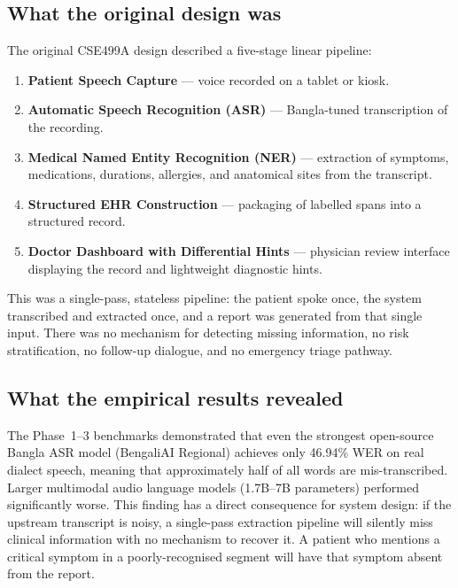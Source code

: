 \documentclass[12pt,a4paper]{article}
\begin{document}
\subsection{What the original design was}

The original CSE499A design described a five-stage linear pipeline:

\begin{enumerate}[leftmargin=*]
  \item \textbf{Patient Speech Capture} --- voice recorded on a tablet or kiosk.
  \item \textbf{Automatic Speech Recognition (ASR)} --- Bangla-tuned
        transcription of the recording.
  \item \textbf{Medical Named Entity Recognition (NER)} --- extraction of
        symptoms, medications, durations, allergies, and anatomical sites
        from the transcript.
  \item \textbf{Structured EHR Construction} --- packaging of labelled
        spans into a structured record.
  \item \textbf{Doctor Dashboard with Differential Hints} --- physician
        review interface displaying the record and lightweight diagnostic
        hints.
\end{enumerate}

This was a single-pass, stateless pipeline: the patient spoke once, the
system transcribed and extracted once, and a report was generated from
that single input. There was no mechanism for detecting missing
information, no risk stratification, no follow-up dialogue, and no
emergency triage pathway.

\subsection{What the empirical results revealed}

The Phase~1--3 benchmarks demonstrated that even the strongest
open-source Bangla ASR model (BengaliAI Regional) achieves only
46.94\% WER on real dialect speech, meaning that approximately half of
all words are mis-transcribed. Larger multimodal audio language models
(1.7B--7B parameters) performed significantly worse. This finding has a
direct consequence for system design: if the upstream transcript is
noisy, a single-pass extraction pipeline will silently miss clinical
information with no mechanism to recover it. A patient who mentions a
critical symptom in a poorly-recognised segment will have that symptom
absent from the report.
\end{document}
